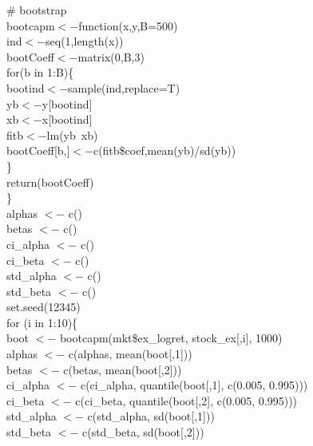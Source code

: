 \documentclass[11pt, conference]{IEEEtran}
\begin{document}
\# bootstrap\\
bootcapm$<-$function(x,y,B=500){\\
	ind$<-$seq(1,length(x))\\
	bootCoeff$<-$matrix(0,B,3)\\
	for(b in 1:B)\{\\
		bootind$<-$sample(ind,replace=T)\\
		yb$<-$y[bootind]\\
		xb$<-$x[bootind]\\
		fitb$<-$lm(yb~xb)\\
		bootCoeff[b,]$<-$c(fitb\$coef,mean(yb)/sd(yb))\\
	\}\\
	return(bootCoeff)\\
\}\\

alphas $<-$ c()\\
betas $<-$ c()\\
ci\_alpha $<-$ c()\\
ci\_beta $<-$ c()\\
std\_alpha $<-$ c()\\
std\_beta $<-$ c()\\

set.seed(12345)\\
for (i in 1:10)\{\\
	boot $<-$ bootcapm(mkt\$ex\_logret, stock\_ex[,i], 1000)\\
	alphas $<-$ c(alphas, mean(boot[,1]))\\
	betas $<-$ c(betas, mean(boot[,2]))\\
	ci\_alpha $<-$ c(ci\_alpha, quantile(boot[,1], c(0.005, 0.995)))\\
	ci\_beta $<-$ c(ci\_beta, quantile(boot[,2], c(0.005, 0.995)))\\
	std\_alpha $<-$ c(std\_alpha, sd(boot[,1]))\\
	std\_beta $<-$ c(std\_beta, sd(boot[,2]))\\
}\\



\end{document}
